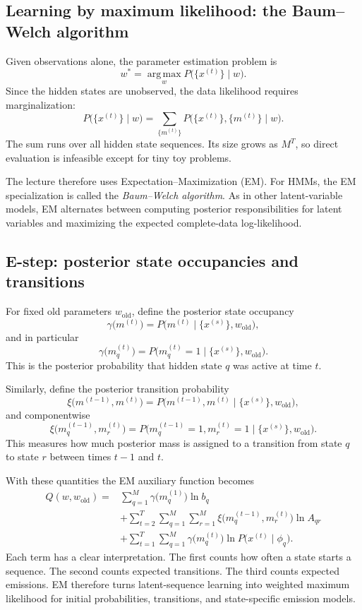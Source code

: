 \subsection{Learning by maximum likelihood: the Baum--Welch algorithm}

Given observations alone, the parameter estimation problem is
\[
  w^*
  =
  \operatorname*{arg\,max}_{w}
  P\bigl(\{x^{(t)}\}\mid w\bigr).
\]
Since the hidden states are unobserved, the data likelihood requires marginalization:
\[
  P\bigl(\{x^{(t)}\}\mid w\bigr)
  =
  \sum_{\{m^{(t)}\}}
  P\bigl(\{x^{(t)}\},\{m^{(t)}\}\mid w\bigr).
\]
The sum runs over all hidden state sequences. Its size grows as $M^T$, so direct evaluation is infeasible except for tiny toy problems.

The lecture therefore uses Expectation--Maximization (EM). For HMMs, the EM specialization is called the \emph{Baum--Welch algorithm}. As in other latent-variable models, EM alternates between computing posterior responsibilities for latent variables and maximizing the expected complete-data log-likelihood.

\subsection{E-step: posterior state occupancies and transitions}

For fixed old parameters $w_{\text{old}}$, define the posterior state occupancy
\[
  \gamma\bigl(m^{(t)}\bigr)
  =
  P\bigl(m^{(t)}\mid \{x^{(s)}\},w_{\text{old}}\bigr),
\]
and in particular
\[
  \gamma\bigl(m_q^{(t)}\bigr)
  =
  P\bigl(m_q^{(t)}=1\mid \{x^{(s)}\},w_{\text{old}}\bigr).
\]
This is the posterior probability that hidden state $q$ was active at time $t$.

Similarly, define the posterior transition probability
\[
  \xi\bigl(m^{(t-1)},m^{(t)}\bigr)
  =
  P\bigl(m^{(t-1)},m^{(t)}\mid \{x^{(s)}\},w_{\text{old}}\bigr),
\]
and componentwise
\[
  \xi\bigl(m_q^{(t-1)},m_r^{(t)}\bigr)
  =
  P\bigl(m_q^{(t-1)}=1,m_r^{(t)}=1\mid \{x^{(s)}\},w_{\text{old}}\bigr).
\]
This measures how much posterior mass is assigned to a transition from state $q$ to state $r$ between times $t-1$ and $t$.

With these quantities the EM auxiliary function becomes
\[
\begin{aligned}
  Q(w,w_{\text{old}})
  ={}&
  \sum_{q=1}^{M}
  \gamma\bigl(m_q^{(1)}\bigr)\ln b_q\\
  &+
  \sum_{t=2}^{T}\sum_{q=1}^{M}\sum_{r=1}^{M}
  \xi\bigl(m_q^{(t-1)},m_r^{(t)}\bigr)\ln A_{qr}\\
  &+
  \sum_{t=1}^{T}\sum_{q=1}^{M}
  \gamma\bigl(m_q^{(t)}\bigr)
  \ln P\bigl(x^{(t)}\mid \phi_q\bigr).
\end{aligned}
\]
Each term has a clear interpretation. The first counts how often a state starts a sequence. The second counts expected transitions. The third counts expected emissions. EM therefore turns latent-sequence learning into weighted maximum likelihood for initial probabilities, transitions, and state-specific emission models.

